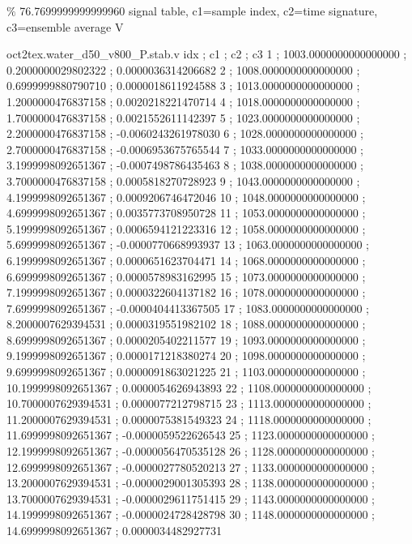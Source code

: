 \expandafter\def\csname oct2tex.water_d50_v800_P.hub.u\endcsname{\ensuremath{\%}}
\expandafter\def\csname oct2tex.water_d50_v800_P.hub.v\endcsname{76.7699999999999960}
\expandafter\def\csname oct2tex.water_d50_v800_P.stab.d\endcsname{signal table, c1=sample index, c2=time signature, c3=ensemble average}
\expandafter\def\csname oct2tex.water_d50_v800_P.stab.u\endcsname{\ensuremath{\text{V}}}
\begin{filecontents}[overwrite]{oct2tex.water_d50_v800_P.stab.v}
idx ; c1 ; c2 ; c3
1 ; 1003.0000000000000000 ; 0.2000000029802322 ; 0.0000036314206682
2 ; 1008.0000000000000000 ; 0.6999999880790710 ; 0.0000018611924588
3 ; 1013.0000000000000000 ; 1.2000000476837158 ; 0.0020218221470714
4 ; 1018.0000000000000000 ; 1.7000000476837158 ; 0.0021552611142397
5 ; 1023.0000000000000000 ; 2.2000000476837158 ; -0.0060243261978030
6 ; 1028.0000000000000000 ; 2.7000000476837158 ; -0.0006953675765544
7 ; 1033.0000000000000000 ; 3.1999998092651367 ; -0.0007498786435463
8 ; 1038.0000000000000000 ; 3.7000000476837158 ; 0.0005818270728923
9 ; 1043.0000000000000000 ; 4.1999998092651367 ; 0.0009206746472046
10 ; 1048.0000000000000000 ; 4.6999998092651367 ; 0.0035773708950728
11 ; 1053.0000000000000000 ; 5.1999998092651367 ; 0.0006594121223316
12 ; 1058.0000000000000000 ; 5.6999998092651367 ; -0.0000770668993937
13 ; 1063.0000000000000000 ; 6.1999998092651367 ; 0.0000651623704471
14 ; 1068.0000000000000000 ; 6.6999998092651367 ; 0.0000578983162995
15 ; 1073.0000000000000000 ; 7.1999998092651367 ; 0.0000322604137182
16 ; 1078.0000000000000000 ; 7.6999998092651367 ; -0.0000404413367505
17 ; 1083.0000000000000000 ; 8.2000007629394531 ; 0.0000319551982102
18 ; 1088.0000000000000000 ; 8.6999998092651367 ; 0.0000205402211577
19 ; 1093.0000000000000000 ; 9.1999998092651367 ; 0.0000171218380274
20 ; 1098.0000000000000000 ; 9.6999998092651367 ; 0.0000091863021225
21 ; 1103.0000000000000000 ; 10.1999998092651367 ; 0.0000054626943893
22 ; 1108.0000000000000000 ; 10.7000007629394531 ; 0.0000077212798715
23 ; 1113.0000000000000000 ; 11.2000007629394531 ; 0.0000075381549323
24 ; 1118.0000000000000000 ; 11.6999998092651367 ; -0.0000059522626543
25 ; 1123.0000000000000000 ; 12.1999998092651367 ; -0.0000056470535128
26 ; 1128.0000000000000000 ; 12.6999998092651367 ; -0.0000027780520213
27 ; 1133.0000000000000000 ; 13.2000007629394531 ; -0.0000029001305393
28 ; 1138.0000000000000000 ; 13.7000007629394531 ; -0.0000029611751415
29 ; 1143.0000000000000000 ; 14.1999998092651367 ; -0.0000024728428798
30 ; 1148.0000000000000000 ; 14.6999998092651367 ; 0.0000034482927731

\end{filecontents}
